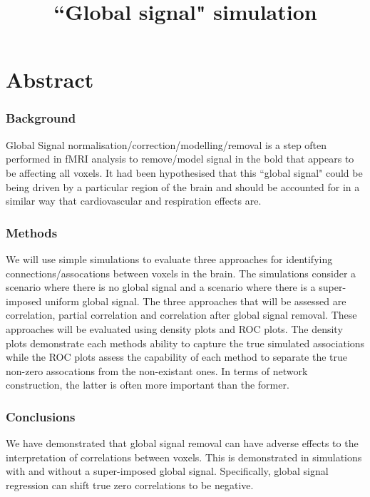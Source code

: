 \documentclass[a4paper]{article}\usepackage[]{graphicx}\usepackage[]{color}
\makeatletter
\newenvironment{kframe}{%
 \def\at@end@of@kframe{}%
 \ifinner\ifhmode%
  \def\at@end@of@kframe{\end{minipage}}%
  \begin{minipage}{\columnwidth}%
 \fi\fi%
 \def\FrameCommand##1{\hskip\@totalleftmargin \hskip-\fboxsep
 \colorbox{shadecolor}{##1}\hskip-\fboxsep
     \hskip-\linewidth \hskip-\@totalleftmargin \hskip\columnwidth}%
 \MakeFramed {\advance\hsize-\width
   \@totalleftmargin\z@ \linewidth\hsize
   \@setminipage}}%
 {\par\unskip\endMakeFramed%
 \at@end@of@kframe}
\newenvironment{knitrout}{}{} %
\makeatother
\begin{document}
\title{``Global signal" simulation}
\maketitle

\begin{knitrout}
\color{fgcolor}\begin{kframe}


{\ttfamily\noindent\color{warningcolor}{\#\# Warning: package 'ggplot2' was built under R version 3.1.1}}\end{kframe}
\end{knitrout}


\section{Abstract}

\subsubsection*{Background}
Global Signal normalisation/correction/modelling/removal is a step often performed in fMRI analysis to remove/model signal in the bold that appears to be affecting all voxels. It had been hypothesised that this ``global signal" could be being driven by a particular region of the brain and should be accounted for in a similar way that cardiovascular and respiration effects are. 

\subsubsection*{Methods}
We will use simple simulations to evaluate three approaches for identifying connections/assocations between voxels in the brain. The simulations consider a scenario where there is no global signal and a scenario where there is a super-imposed  uniform global signal. The three approaches that will be assessed are correlation, partial correlation and correlation after global signal removal. These approaches will be evaluated using density plots and ROC plots. The density plots demonstrate each methods ability to capture the true simulated associations while the ROC plots assess the capability of each method to separate the true non-zero assocations from the non-existant ones. In terms of network construction, the latter is often more important than the former.

\subsubsection*{Conclusions}
We have demonstrated that global signal removal can have adverse effects to the interpretation of correlations between voxels. This is demonstrated in simulations with and without a super-imposed global signal. Specifically, global signal regression can shift true zero correlations to be negative. 
\end{document}
